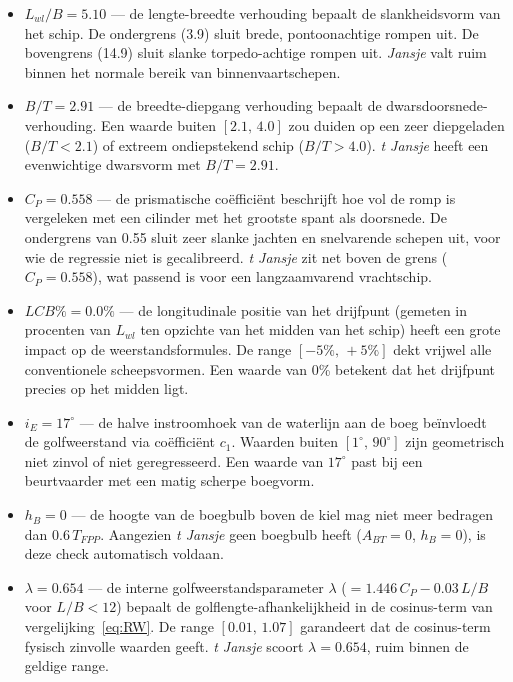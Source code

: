 \begin{itemize}
    \item \textbf{$L_{wl}/B = 5.10$} --- de lengte-breedte verhouding bepaalt de slankheidsvorm van het schip. De ondergrens (3.9) sluit brede, pontoonachtige rompen uit. De bovengrens (14.9) sluit slanke torpedo-achtige rompen uit. \emph{Jansje} valt ruim binnen het normale bereik van binnenvaartschepen.

    \item \textbf{$B/T = 2.91$} --- de breedte-diepgang verhouding bepaalt de dwarsdoorsnede-verhouding. Een waarde buiten $[2.1,\,4.0]$ zou duiden op een zeer diepgeladen ($B/T < 2.1$) of extreem ondiepstekend schip ($B/T > 4.0$). \emph{t Jansje} heeft een evenwichtige dwarsvorm met $B/T = 2.91$.

    \item \textbf{$C_P = 0.558$} --- de prismatische coëfficiënt beschrijft hoe vol de romp is vergeleken met een cilinder met het grootste spant als doorsnede. De ondergrens van 0.55 sluit zeer slanke jachten en snelvarende schepen uit, voor wie de regressie niet is gecalibreerd. \emph{t Jansje} zit net boven de grens ($C_P = 0.558$), wat passend is voor een langzaamvarend vrachtschip.

    \item \textbf{$LCB\% = 0.0\%$} --- de longitudinale positie van het drijfpunt (gemeten in procenten van $L_{wl}$ ten opzichte van het midden van het schip) heeft een grote impact op de weerstandsformules. De range $[-5\%,\,+5\%]$ dekt vrijwel alle conventionele scheepsvormen. Een waarde van 0\% betekent dat het drijfpunt precies op het midden ligt.

    \item \textbf{$i_E = 17^\circ$} --- de halve instroomhoek van de waterlijn aan de boeg beïnvloedt de golfweerstand via coëfficiënt $c_1$. Waarden buiten $[1^\circ,\,90^\circ]$ zijn geometrisch niet zinvol of niet geregresseerd. Een waarde van $17^\circ$ past bij een beurtvaarder met een matig scherpe boegvorm.

    \item \textbf{$h_B = 0$} --- de hoogte van de boegbulb boven de kiel mag niet meer bedragen dan $0.6\,T_{FPP}$. Aangezien \emph{t Jansje} geen boegbulb heeft ($A_{BT} = 0$, $h_B = 0$), is deze check automatisch voldaan.

    \item \textbf{$\lambda = 0.654$} --- de interne golfweerstandsparameter $\lambda$ ($= 1.446\,C_P - 0.03\,L/B$ voor $L/B < 12$) bepaalt de golflengte-afhankelijkheid in de cosinus-term van vergelijking~\eqref{eq:RW}. De range $[0.01,\,1.07]$ garandeert dat de cosinus-term fysisch zinvolle waarden geeft. \emph{t Jansje} scoort $\lambda = 0.654$, ruim binnen de geldige range.


\end{itemize}
